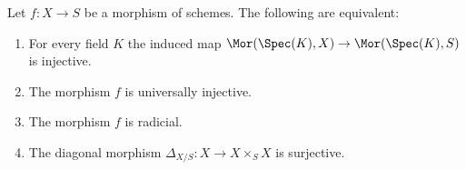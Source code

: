 \begin{lemma}
\label{lemma-universally-injective}
\begin{reference}
\cite[Proposition 3.7.1]{EGA1-second}
\end{reference}
Let $f : X \to S$ be a morphism of schemes.
The following are equivalent:
\begin{enumerate}
\item For every field $K$ the induced map
$\Mor(\Spec(K), X) \to \Mor(\Spec(K), S)$
is injective.
\item The morphism $f$ is universally injective.
\item The morphism $f$ is radicial.
\item The diagonal morphism $\Delta_{X/S} : X \longrightarrow X \times_S X$
is surjective.
\end{enumerate}
\end{lemma}

